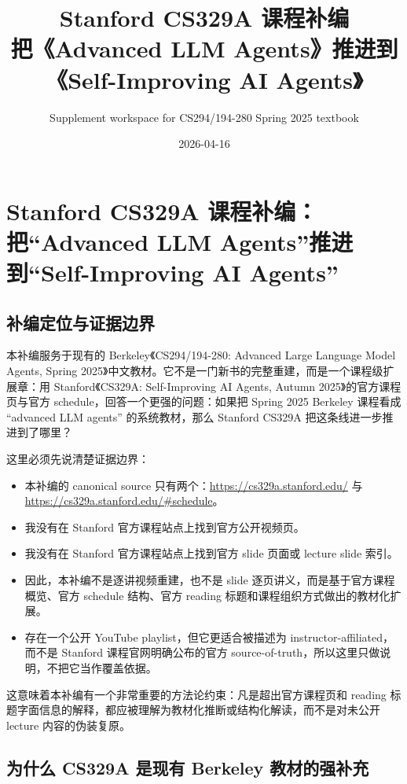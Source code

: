\documentclass[UTF8]{ctexbook}
\title{Stanford CS329A 课程补编\\把《Advanced LLM Agents》推进到《Self-Improving AI Agents》}
\author{Supplement workspace for CS294/194-280 Spring 2025 textbook}
\date{2026-04-16}
\begin{document}
\maketitle
\tableofcontents

\chapter{Stanford CS329A 课程补编：把“Advanced LLM Agents”推进到“Self-Improving AI Agents”}

\section{补编定位与证据边界}

本补编服务于现有的 Berkeley《CS294/194-280: Advanced Large Language Model Agents, Spring 2025》中文教材。它不是一门新书的完整重建，而是一个课程级扩展章：用 Stanford《CS329A: Self-Improving AI Agents, Autumn 2025》的官方课程页与官方 schedule，回答一个更强的问题：如果把 Spring 2025 Berkeley 课程看成 ``advanced LLM agents'' 的系统教材，那么 Stanford CS329A 把这条线进一步推进到了哪里？

这里必须先说清楚证据边界：
\begin{itemize}
\item 本补编的 canonical source 只有两个：\url{https://cs329a.stanford.edu/} 与 \url{https://cs329a.stanford.edu/#schedule}。
\item 我没有在 Stanford 官方课程站点上找到官方公开视频页。
\item 我没有在 Stanford 官方课程站点上找到官方 slide 页面或 lecture slide 索引。
\item 因此，本补编不是逐讲视频重建，也不是 slide 逐页讲义，而是基于官方课程概览、官方 schedule 结构、官方 reading 标题和课程组织方式做出的教材化扩展。
\item 存在一个公开 YouTube playlist，但它更适合被描述为 instructor-affiliated，而不是 Stanford 课程官网明确公布的官方 source-of-truth，所以这里只做说明，不把它当作覆盖依据。
\end{itemize}

这意味着本补编有一个非常重要的方法论约束：凡是超出官方课程页和 reading 标题字面信息的解释，都应被理解为教材化推断或结构化解读，而不是对未公开 lecture 内容的伪装复原。

\section{为什么 CS329A 是现有 Berkeley 教材的强补充}
\end{document}
